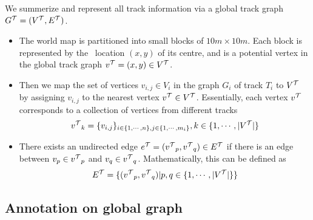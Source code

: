 We summerize and represent all track information via a global track graph ${G^{\mathcal{T}}}=({V^{\mathcal{T}}},{E^{\mathcal{T}}})$.
\begin{itemize}
	\item The world map is partitioned into small blocks of $10m\times10m$. Each block is represented by the \gps\ location $(x,y)$ of its centre, and is a potential vertex in the global track graph ${v^{\mathcal{T}}}=(x,y)\in{V^{\mathcal{T}}}$. 
	\item Then we map the set of vertices $v_{i,j}\in V_i$ in the graph $G_i$ of track $T_i$ to ${V^{\mathcal{T}}}$ by assigning $v_{i,j}$ to the nearest vertex ${v^{\mathcal{T}}}\in{V^{\mathcal{T}}}$. Essentially, each vertex ${v^{\mathcal{T}}}$ corresponds to a collection of vertices from different tracks
	\begin{align*}
		{v^{\mathcal{T}}}_k = \{v_{i,j}\}_{i\in\{1,\cdots,n\}, j\in\{1,\cdots,m_i\}}, k\in\{1,\cdots,|{V^{\mathcal{T}}}|\}
	\end{align*}
	\item There exists an undirected edge ${e^{\mathcal{T}}}=({v^{\mathcal{T}}}_p,{v^{\mathcal{T}}}_q)\in{E^{\mathcal{T}}}$ if there is an edge between $v_p\in{v^{\mathcal{T}}}_p$ and $v_q\in{v^{\mathcal{T}}}_q$. Mathematically, this can be defined as
	\begin{align*}
		{E^{\mathcal{T}}} = \{({v^{\mathcal{T}}}_p,{v^{\mathcal{T}}}_q)|p,q\in\{1,\cdots,|{V^{\mathcal{T}}}|\}\}
	\end{align*}
\end{itemize}




\subsection{Annotation on global graph}



